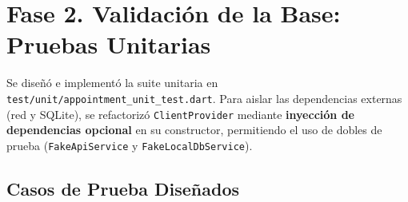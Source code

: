 \documentclass[11pt,a4paper]{article}
\begin{document}
\section{Fase 2. Validación de la Base: Pruebas Unitarias}

Se diseñó e implementó la suite unitaria en \texttt{test/unit/appointment\_unit\_test.dart}. Para aislar las dependencias externas (red y SQLite), se refactorizó \texttt{ClientProvider} mediante \textbf{inyección de dependencias opcional} en su constructor, permitiendo el uso de dobles de prueba (\texttt{FakeApiService} y \texttt{FakeLocalDbService}).

\subsection{Casos de Prueba Diseñados}
\end{document}
